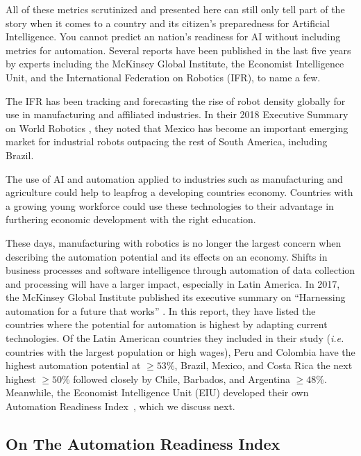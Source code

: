 \documentclass[conference]{IEEEtran}
\begin{document}
All of these metrics scrutinized and presented here can still only tell part of the story when it comes to a country and its citizen's preparedness for Artificial Intelligence. You cannot predict an nation's readiness for AI without including metrics for automation. Several reports have been published in the last five years by experts including the McKinsey Global Institute, the Economist Intelligence Unit, and the International Federation on Robotics (IFR), to name a few.

The IFR has been tracking and forecasting the rise of robot density globally for use in manufacturing and affiliated industries. In their 2018 Executive Summary on World Robotics \cite{robotics2016executive}, they noted that Mexico has become an important emerging market for industrial robots outpacing the rest of South America, including Brazil.

The use of AI and automation applied to industries such as manufacturing and agriculture could help to leapfrog a developing countries economy. Countries with a growing young workforce could use these technologies to their advantage in furthering economic development with the right education.

These days, manufacturing with robotics is no longer the largest concern when describing the automation potential and its effects on an economy. Shifts in business processes and software intelligence through automation of data collection and processing will have a larger impact, especially in Latin America. In 2017, the McKinsey Global Institute published its executive summary on ``Harnessing automation for a future that works'' \cite{manyika2017future}. In this report, they have listed the countries where the potential for automation is highest by adapting current technologies. Of the Latin American countries they included in their study (\emph{i.e.} countries with the largest population or high wages), Peru and Colombia have the highest automation potential at $\geq 53\%$, Brazil, Mexico, and Costa Rica the next highest $\geq 50\%$ followed closely by Chile, Barbados, and Argentina $\geq 48\%$. Meanwhile, the Economist Intelligence Unit (EIU) developed their own Automation Readiness Index~\cite{unit2018automation}, which we discuss next.


\subsection{On The Automation Readiness Index}
\end{document}
